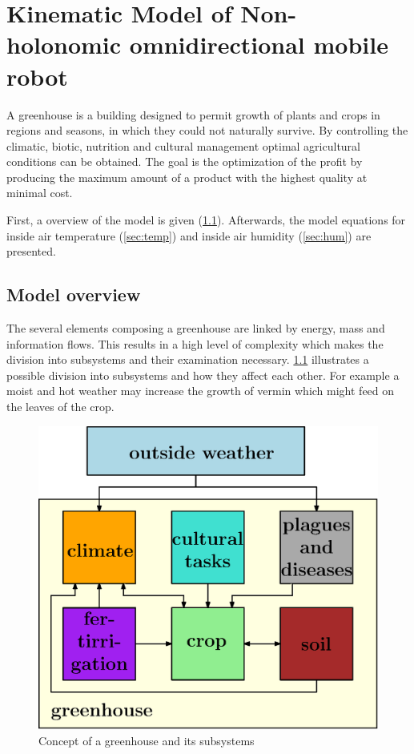 \chapter{Kinematic Model of Non-holonomic omnidirectional mobile robot}
\label{cha:Kinematic}

A greenhouse is a building designed to permit growth of plants and crops in regions and seasons, in which they could not naturally survive. By controlling the climatic, biotic, nutrition and cultural management optimal agricultural conditions can be obtained. The goal is the optimization of the profit by producing the maximum amount of a product with the highest quality at minimal cost.

First, a overview of the model is given (\cref{sec:model_overview}).
Afterwards, the model equations for inside air temperature (\cref{sec:temp}) and inside air humidity (\cref{sec:hum}) are presented.

\section{Model overview}
\label{sec:model_overview}

The several elements composing a greenhouse are linked by energy, mass and information flows.
This results in a high level of complexity which makes the division into subsystems and their examination necessary.
\cref{fig:greenhouse_subsystems} illustrates a possible division into subsystems and how they affect each other.
For example a moist and hot weather may increase the growth of vermin which might feed on the leaves of the crop.

\begin{figure}[t]
\begin{center}
\includegraphics[width=.7\textwidth]{../Figures/subsystems.eps}
\caption{Concept of a greenhouse and its subsystems}
\label{fig:greenhouse_subsystems}
\end{center}
\end{figure}

